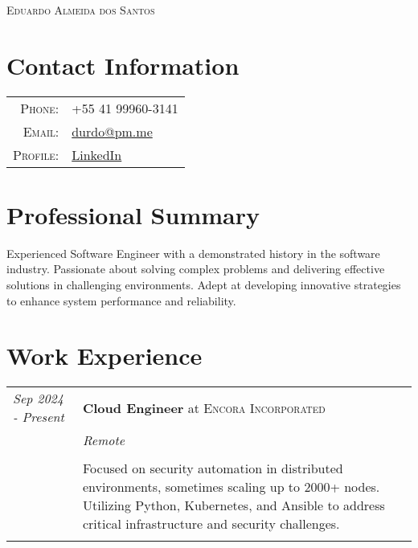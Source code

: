 \documentclass[a4paper,10pt]{article}
\begin{document}
\pagestyle{empty} %

\begin{center}
    {\Huge \textsc{Eduardo Almeida dos Santos}}\\
    \vspace{0.2cm}
\end{center}

\section*{Contact Information}
\begin{tabular}{@{} rl @{}}
    \textsc{Phone:}   & +55 41 99960-3141 \\
    \textsc{Email:}   & \href{mailto:durdo@pm.me}{durdo@pm.me} \\
    \textsc{Profile:} & \href{https://www.linkedin.com/in/durdo/}{LinkedIn} \\
\end{tabular}

\section*{Professional Summary}
    Experienced Software Engineer with a demonstrated history in the software industry. Passionate about solving complex problems and delivering effective solutions in challenging environments. Adept at developing innovative strategies to enhance system performance and reliability.

\section*{Work Experience}
    \begin{tabular}{@{} p{2.8cm} | p{12.2cm} @{}}
        \emph{Sep 2024 - Present}
        &\textbf{Cloud Engineer} at \textsc
        {Encora Incorporated} \\

        &\emph
        {Remote} \\ \\
        &\normalsize
        {
            Focused on security automation in distributed environments,
            sometimes scaling up to 2000+ nodes. Utilizing Python,
            Kubernetes, and Ansible to address critical infrastructure
            and security challenges.
        } \\
        \multicolumn{2}{c}{} \\
    \end{tabular}
\end{document}
